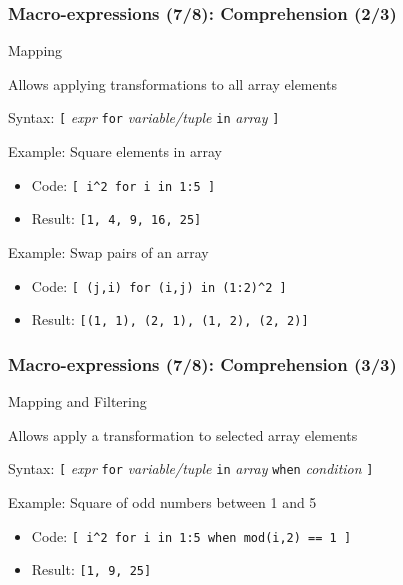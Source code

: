 \documentclass[handout,usepdftitle=false,xcolor=dvipsnames,aspectratio=169]{beamer}
\begin{document}
\begin{frame}[fragile]
  \frametitle{Macro-expressions (7/8): Comprehension (2/3)}
  \begin{block}{Mapping}
    \begin{witemize}
      \item Allows applying transformations to all array elements
      \item Syntax: \texttt{[} \textit{expr} \texttt{for} \textit{variable/tuple}
      \texttt{in} \textit{array} \texttt{]}
      \item Example: Square elements in array
      \begin{itemize}
        \item Code: \texttt{[ i\^{}2 for i in 1:5 ]}
        \item Result: \texttt{[1, 4, 9, 16, 25]}
      \end{itemize}
      \item Example: Swap pairs of an array
      \begin{itemize}
        \item Code: \texttt{[ (j,i) for (i,j) in (1:2)\^{}2 ]}
        \item Result: \texttt{[(1, 1), (2, 1), (1, 2), (2, 2)]}
      \end{itemize}
    \end{witemize}
  \end{block}
\end{frame}

\begin{frame}[fragile]
  \frametitle{Macro-expressions (7/8): Comprehension (3/3)}
  \begin{block}{Mapping and Filtering}
    \begin{witemize}
      \item Allows apply a transformation to selected array elements
      \item Syntax: \texttt{[} \textit{expr} \texttt{for} \textit{variable/tuple}
      \texttt{in} \textit{array} \texttt{when} \textit{condition} \texttt{]}
      \item Example: Square of odd numbers between 1 and 5
      \begin{itemize}
        \item Code: \texttt{[ i\^{}2 for i in 1:5 when mod(i,2) == 1 ]}
        \item Result: \texttt{[1, 9, 25]}
      \end{itemize}
    \end{witemize}
  \end{block}
\end{frame}
\end{document}
